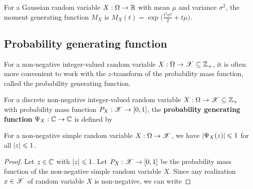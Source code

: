 \documentclass[letterpaper,10pt,english]{article}
\begin{document}
\begin{shaded}
\begin{exmp} 
For a Gaussian random variable $X: \Omega \to \mathbb{R}$ with mean $\mu$ and variance $\sigma^2$, 
the moment generating function $M_X$ is 
$
M_X(t) = \exp\Big(\frac{t^2\sigma^2}{2}+t\mu\Big).
$
\end{exmp}
\end{shaded}

\subsection{Probability generating function}
For a non-negative integer-valued random variable $X: \Omega \to \mathscr{X} \subseteq \mathbb{Z}_+$, 
it is often more convenient to work with the $z$-transform of the probability mass function, 
called the probability generating function. 
\begin{defn}
For a discrete non-negative integer-valued random variable $X: \Omega \to \mathscr{X} \subseteq \mathbb{Z}_+$ with probability mass function $P_X: \mathscr{X} \to [0,1]$, the \textbf{probability generating function} $\Psi_X: \mathbb{C} \to \mathbb{C}$ is defined by
\end{defn} 
\begin{lem}
For a non-negative simple random variable $X: \Omega \to \mathscr{X}$, we have $\left\lvert\Psi_X(z)\right\rvert \leqslant 1$ for all $\left\lvert z\right\rvert \leqslant 1$. 
\end{lem}
\begin{proof}
Let $z \in \mathbb{C}$ with $\left\lvert z\right\rvert\leqslant 1$. 
Let $P_X : \mathscr{X} \to [0,1]$ be the probability mass function of the non-negative simple random variable $X$. 
Since any realization $x \in \mathscr{X}$ of random variable $X$ is non-negative, we can write 
\end{proof}
\end{document}
